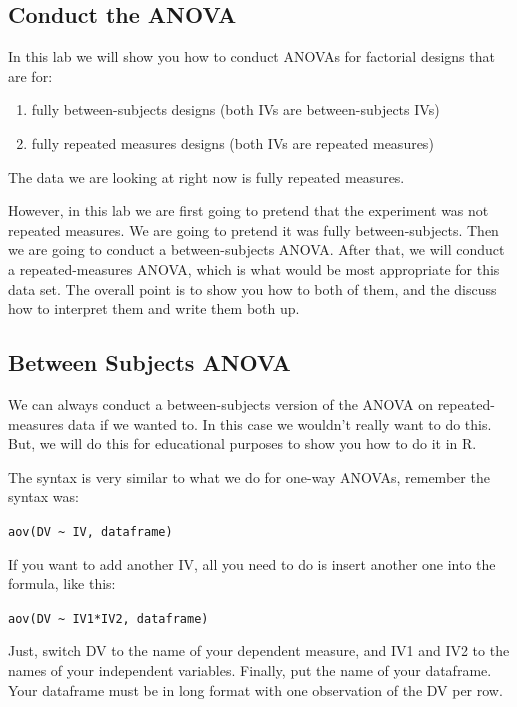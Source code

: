 \documentclass[]{book}
\providecommand{\tightlist}{%
  \setlength{\itemsep}{0pt}\setlength{\parskip}{0pt}}
\begin{document}
\subsection{Conduct the ANOVA}\label{conduct-the-anova-1}

In this lab we will show you how to conduct ANOVAs for factorial designs
that are for:

\begin{enumerate}
\def\labelenumi{\arabic{enumi}.}
\tightlist
\item
  fully between-subjects designs (both IVs are between-subjects IVs)
\item
  fully repeated measures designs (both IVs are repeated measures)
\end{enumerate}

The data we are looking at right now is fully repeated measures.

However, in this lab we are first going to pretend that the experiment
was not repeated measures. We are going to pretend it was fully
between-subjects. Then we are going to conduct a between-subjects ANOVA.
After that, we will conduct a repeated-measures ANOVA, which is what
would be most appropriate for this data set. The overall point is to
show you how to both of them, and the discuss how to interpret them and
write them both up.

\subsection{Between Subjects ANOVA}\label{between-subjects-anova}

We can always conduct a between-subjects version of the ANOVA on
repeated-measures data if we wanted to. In this case we wouldn't really
want to do this. But, we will do this for educational purposes to show
you how to do it in R.

The syntax is very similar to what we do for one-way ANOVAs, remember
the syntax was:

\texttt{aov(DV\ \textasciitilde{}\ IV,\ dataframe)}

If you want to add another IV, all you need to do is insert another one
into the formula, like this:

\texttt{aov(DV\ \textasciitilde{}\ IV1*IV2,\ dataframe)}

Just, switch DV to the name of your dependent measure, and IV1 and IV2
to the names of your independent variables. Finally, put the name of
your dataframe. Your dataframe must be in long format with one
observation of the DV per row.
\end{document}
